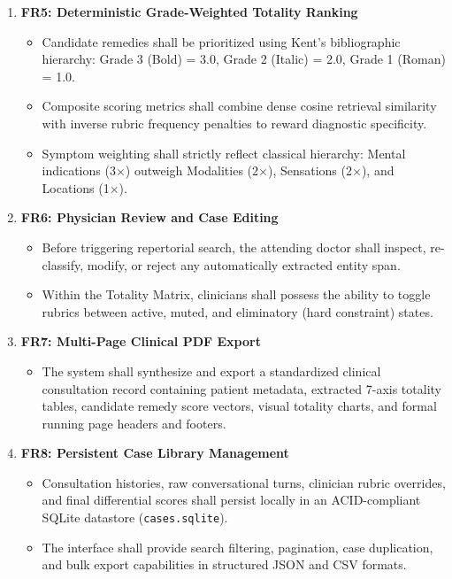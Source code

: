 \begin{enumerate}
  \item \textbf{FR5: Deterministic Grade-Weighted Totality Ranking}
  \begin{itemize}
    \item Candidate remedies shall be prioritized using Kent's bibliographic hierarchy: Grade 3 (Bold) = 3.0, Grade 2 (Italic) = 2.0, Grade 1 (Roman) = 1.0.
    \item Composite scoring metrics shall combine dense cosine retrieval similarity with inverse rubric frequency penalties to reward diagnostic specificity.
    \item Symptom weighting shall strictly reflect classical hierarchy: Mental indications (3$\times$) outweigh Modalities (2$\times$), Sensations (2$\times$), and Locations (1$\times$).
  \end{itemize}

  \item \textbf{FR6: Physician Review and Case Editing}
  \begin{itemize}
    \item Before triggering repertorial search, the attending doctor shall inspect, re-classify, modify, or reject any automatically extracted entity span.
    \item Within the Totality Matrix, clinicians shall possess the ability to toggle rubrics between active, muted, and eliminatory (hard constraint) states.
  \end{itemize}

  \item \textbf{FR7: Multi-Page Clinical PDF Export}
  \begin{itemize}
    \item The system shall synthesize and export a standardized clinical consultation record containing patient metadata, extracted 7-axis totality tables, candidate remedy score vectors, visual totality charts, and formal running page headers and footers.
  \end{itemize}

  \item \textbf{FR8: Persistent Case Library Management}
  \begin{itemize}
    \item Consultation histories, raw conversational turns, clinician rubric overrides, and final differential scores shall persist locally in an ACID-compliant SQLite datastore (\texttt{cases.sqlite}).
    \item The interface shall provide search filtering, pagination, case duplication, and bulk export capabilities in structured JSON and CSV formats.
  \end{itemize}
\end{enumerate}

